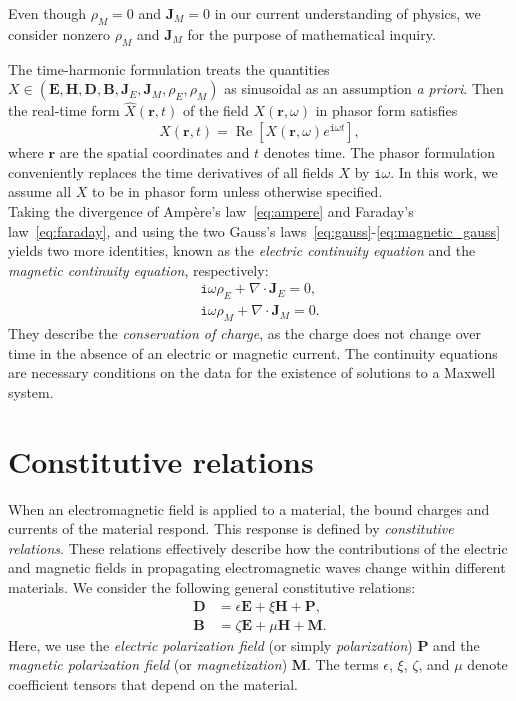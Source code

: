 \documentclass[journal,transmag]{IEEEtran}
\newcommand*\VF[1]{\mathbf{#1}}
\newcommand*\iunit{\mathtt{i}}
\begin{document}
Even though $\rho_{M} = 0$ and $\VF{J}_{M} = 0$ in our current
understanding of physics, we consider nonzero $\rho_{M}$ and $\VF{J}_{M}$
for the purpose of mathematical inquiry.

The time-harmonic formulation treats the quantities 
$X \in (\VF{E}, \VF{H}, \VF{D}, \VF{B}, \VF{J}_E, \VF{J}_M, \rho_E, \rho_M)$
as sinusoidal as an assumption \emph{a priori}.
Then the real-time form $\hat{X}(\VF{r},t)$ of the field ${X}(\VF{r},\omega)$ in phasor form 
satisfies 
\begin{equation} \label{eq:rem:phasor:1}
    \hat{X}(\VF{r},t) = \operatorname{Re}[X(\VF{r},\omega) e^{\iunit \omega t}],
\end{equation}
where $\VF{r}$ are the spatial coordinates and $t$ denotes time.
The phasor formulation conveniently replaces the time derivatives of all fields $X$ by $\iunit \omega$.
In this work, we assume all $X$ to be in phasor form unless otherwise specified. 
\\


Taking the divergence of Amp\`ere's law~\eqref{eq:ampere} and Faraday's law~\eqref{eq:faraday},
and using the two Gauss's laws~\eqref{eq:gauss}-\eqref{eq:magnetic_gauss} 
yields two more identities,
known as the \emph{electric continuity equation}
and the \emph{magnetic continuity equation}, respectively:
\begin{gather}
 \label{eq:continuityequation:electric:cnty}
 \iunit \omega\rho_{E} + \nabla \cdot \VF{J}_{E} = 0,
 \\
 \label{eq:continuityequation:magnetic:cnty}
 \iunit \omega\rho_{M} + \nabla \cdot \VF{J}_{M} = 0.
\end{gather}
They describe the \emph{conservation of charge},
as the charge does not change over time in the absence of an electric or magnetic current.
The continuity equations are necessary conditions on the data for the existence of solutions to a Maxwell system. 







\section{\label{sec:constitutive} Constitutive relations}
When an electromagnetic field is applied to a material, the bound charges and currents of the material respond.
This response is defined by \emph{constitutive relations}. 
These relations effectively describe how the contributions of the electric and magnetic fields in propagating electromagnetic waves change within different materials.
We consider the following general constitutive relations: 
\begin{align}
\label{eq:genconst0a} \VF{D}&=\epsilon\VF{E}+ \xi\VF{H} + \VF{P},\\
\label{eq:genconst0b} \VF{B} &= \zeta\VF{E} + \mu\VF{H} + \VF{M}.
\end{align}
Here, we use the \emph{electric polarization field} (or simply \emph{polarization}) $\VF{P}$ 
and the \emph{magnetic polarization field} (or \emph{magnetization}) $\VF{M}$.
The terms $\epsilon$, $\xi$, $\zeta$, and $\mu$ denote coefficient tensors that depend on the material.
\end{document}
